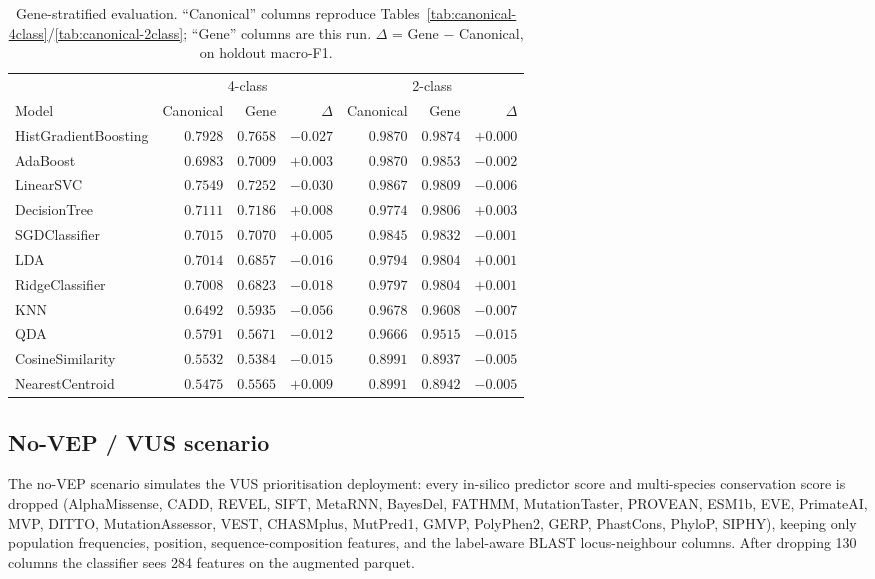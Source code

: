 \documentclass[11pt,a4paper]{article}
\begin{document}
\begin{table}[H]
\centering
\caption{Gene-stratified evaluation. ``Canonical'' columns reproduce
Tables~\ref{tab:canonical-4class}/\ref{tab:canonical-2class}; ``Gene''
columns are this run. $\Delta$ = Gene $-$ Canonical, on holdout macro-F1.}
\label{tab:gene-strat}
\small
\begin{tabular}{lrrrrrr}
\toprule
 & \multicolumn{3}{c}{4-class} & \multicolumn{3}{c}{2-class} \\
\cmidrule(lr){2-4} \cmidrule(lr){5-7}
Model & Canonical & Gene & $\Delta$ & Canonical & Gene & $\Delta$ \\
\midrule
HistGradientBoosting & $0.7928$ & $0.7658$ & $-0.027$ & $0.9870$ & $0.9874$ & $+0.000$ \\
AdaBoost             & $0.6983$ & $0.7009$ & $+0.003$ & $0.9870$ & $0.9853$ & $-0.002$ \\
LinearSVC            & $0.7549$ & $0.7252$ & $-0.030$ & $0.9867$ & $0.9809$ & $-0.006$ \\
DecisionTree         & $0.7111$ & $0.7186$ & $+0.008$ & $0.9774$ & $0.9806$ & $+0.003$ \\
SGDClassifier        & $0.7015$ & $0.7070$ & $+0.005$ & $0.9845$ & $0.9832$ & $-0.001$ \\
LDA                  & $0.7014$ & $0.6857$ & $-0.016$ & $0.9794$ & $0.9804$ & $+0.001$ \\
RidgeClassifier      & $0.7008$ & $0.6823$ & $-0.018$ & $0.9797$ & $0.9804$ & $+0.001$ \\
KNN                  & $0.6492$ & $0.5935$ & $-0.056$ & $0.9678$ & $0.9608$ & $-0.007$ \\
QDA                  & $0.5791$ & $0.5671$ & $-0.012$ & $0.9666$ & $0.9515$ & $-0.015$ \\
CosineSimilarity     & $0.5532$ & $0.5384$ & $-0.015$ & $0.8991$ & $0.8937$ & $-0.005$ \\
NearestCentroid      & $0.5475$ & $0.5565$ & $+0.009$ & $0.8991$ & $0.8942$ & $-0.005$ \\
\bottomrule
\end{tabular}
\end{table}

\subsection{No-VEP / VUS scenario}
\label{sec:no-vep}

The no-VEP scenario simulates the VUS prioritisation deployment: every
in-silico predictor score and multi-species conservation score is dropped
(AlphaMissense, CADD, REVEL, SIFT, MetaRNN, BayesDel, FATHMM, MutationTaster,
PROVEAN, ESM1b, EVE, PrimateAI, MVP, DITTO, MutationAssessor, VEST,
CHASMplus, MutPred1, GMVP, PolyPhen2, GERP, PhastCons, PhyloP, SIPHY), keeping
only population frequencies, position, sequence-composition features, and the
label-aware BLAST locus-neighbour columns. After dropping 130 columns the
classifier sees 284 features on the augmented parquet.
\end{document}

